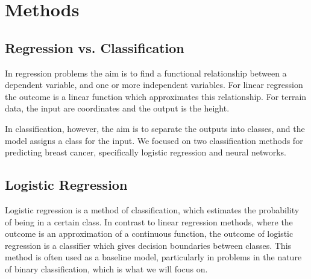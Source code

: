 \section{Methods}\label{sec:methods}
\subsection{Regression vs. Classification}\label{ssec:regression_classification}
In regression problems the aim is to find a functional relationship between a dependent variable, and one or more independent variables. For linear regression the outcome is a linear function which approximates this relationship. For terrain data, the input are coordinates and the output is the height.

In classification, however, the aim is to separate the outputs into classes, and the model assigns a class for the input. We focused on two classification methods for predicting breast cancer, specifically logistic regression and neural networks.


\subsection{Logistic Regression}\label{ssec:logreg}
Logistic regression is a method of classification, which estimates the probability of being in a certain class. In contrast to linear regression methods, where the outcome is an approximation of a continuous function, the outcome of logistic regression is a classifier which gives decision boundaries between classes. This method is often used as a baseline model, particularly in problems in the nature of binary classification, which is what we will focus on.

